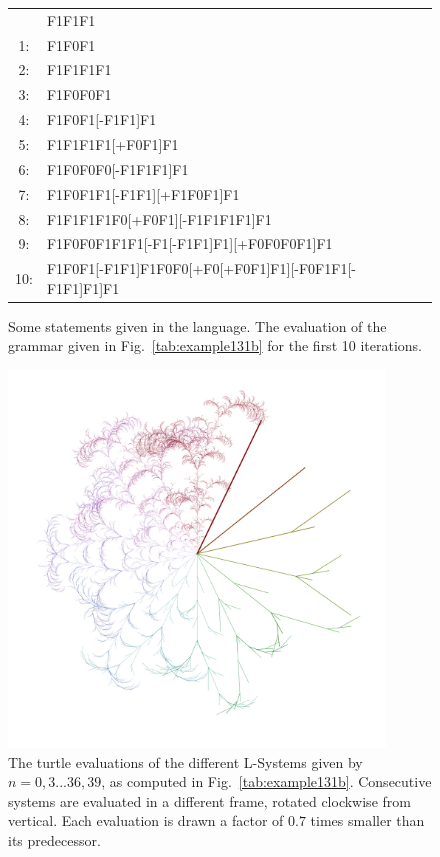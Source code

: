 \begin{figure}
\centering
\begin{tabular} { c l }
& F1F1F1\\
1:& F1F0F1\\
2:& F1F1F1F1\\
3:& F1F0F0F1\\
4:& F1F0F1[-F1F1]F1\\
5:& F1F1F1F1[+F0F1]F1\\
6:& F1F0F0F0[-F1F1F1]F1\\
7:& F1F0F1F1[-F1F1][+F1F0F1]F1\\
8:& F1F1F1F1F0[+F0F1][-F1F1F1F1]F1\\
9:& F1F0F0F1F1F1[-F1[-F1F1]F1][+F0F0F0F1]F1\\
10:& F1F0F1[-F1F1]F1F0F0[+F0[+F0F1]F1][-F0F1F1[-F1F1]F1]F1\\
\end{tabular}
\caption[Evaluation of a L-system's string grammar]{Some statements given in the language. The evaluation of the grammar given in Fig.~\ref{tab:example131b} for the first 10 iterations.}
\label{tab:lsystemEval}
\end{figure}

\begin{figure}
  \centering
  \includegraphics[height=10cm]{lsystem.png}
  \caption[The output of several L-systems]{The turtle evaluations of the different L-Systems given by $n=0,3...36,39$, as computed in Fig.~\ref{tab:example131b}. Consecutive systems are evaluated in a different frame, rotated clockwise from vertical. Each evaluation is drawn a factor of $0.7$ times smaller than its predecessor.}
  \label{fig:lsystemOutput}
\end{figure}

